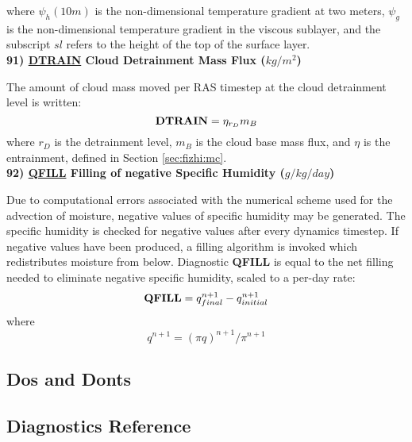 \noindent
where $\psi_h(10m)$ is the non-dimensional temperature gradient at two meters, $\psi_g$ is
the non-dimensional temperature gradient in the viscous sublayer, and the subscript
$sl$ refers to the height of the top of the surface layer.
\\
 
\noindent
{\bf 91)  \underline {DTRAIN} Cloud Detrainment Mass Flux ($kg/m^2$) } 

The amount of cloud mass moved per RAS timestep at the cloud detrainment level is written:
\[
{\bf DTRAIN} = \eta_{r_D}m_B
\]
\noindent
where $r_D$ is the detrainment level, 
$m_B$ is the cloud base mass flux, and $\eta$
is the entrainment, defined in Section \ref{sec:fizhi:mc}.
\\

\noindent
{\bf 92)  \underline {QFILL}  Filling of negative Specific Humidity ($g/kg/day$) }

\noindent
Due to computational errors associated with the numerical scheme used for
the advection of moisture, negative values of specific humidity may be generated.  The
specific humidity is checked for negative values after every dynamics timestep.  If negative
values have been produced, a filling algorithm is invoked which redistributes moisture from
below.  Diagnostic {\bf QFILL} is equal to the net filling needed
to eliminate negative specific humidity, scaled to a per-day rate:
\[
{\bf QFILL} = q^{n+1}_{final} - q^{n+1}_{initial}
\]
where
\[
q^{n+1} = (\pi q)^{n+1} / \pi^{n+1}
\]

\subsection{Dos and Donts}

\subsection{Diagnostics Reference}


